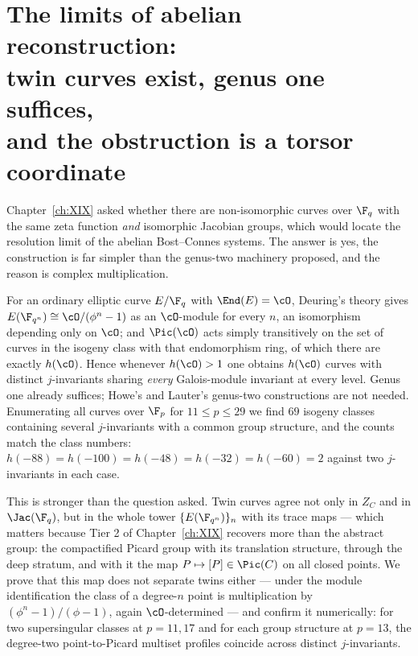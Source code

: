 \chapter[The limits of abelian reconstruction]{The limits of abelian reconstruction:\\ twin curves exist, genus one suffices,\\ and the obstruction is a torsor coordinate}\label{ch:XX}
\begin{summary}
Chapter~\ref{ch:XIX} asked whether there are non-isomorphic curves over $\F_q$ with the
same zeta function \emph{and} isomorphic Jacobian groups, which would locate the resolution
limit of the abelian Bost--Connes systems. The answer is yes, the construction is far simpler
than the genus-two machinery proposed, and the reason is complex multiplication.

For an ordinary elliptic curve $E/\F_q$ with $\End(E)=\cO$, Deuring's theory gives
$E(\F_{q^n})\cong\cO/(\phi^n-1)$ as an $\cO$-module for every $n$, an isomorphism depending
only on $\cO$; and $\Pic(\cO)$ acts simply transitively on the set of curves in the isogeny
class with that endomorphism ring, of which there are exactly $h(\cO)$. Hence whenever
$h(\cO)>1$ one obtains $h(\cO)$ curves with distinct $j$-invariants sharing \emph{every}
Galois-module invariant at every level. Genus one already suffices; Howe's and Lauter's
genus-two constructions are not needed. Enumerating all curves over $\F_p$ for $11\le p\le29$ we
find $69$ isogeny classes containing several $j$-invariants with a common group structure,
and the counts match the class numbers: $h(-88)=h(-100)=h(-48)=h(-32)=h(-60)=2$ against two
$j$-invariants in each case.

This is stronger than the question asked. Twin curves agree not only in $Z_C$ and in
$\Jac(\F_q)$, but in the whole tower $\{E(\F_{q^n})\}_n$ with its trace maps --- which matters
because Tier 2 of Chapter~\ref{ch:XIX} recovers more than the abstract group: the compactified Picard
group with its translation structure, through the deep stratum, and with it the map
$P\mapsto[P]\in\Pic(C)$ on all closed points. We prove that this map does not separate twins
either --- under the module identification the class of a degree-$n$ point is multiplication
by $(\phi^n-1)/(\phi-1)$, again $\cO$-determined --- and confirm it numerically: for two
supersingular classes at $p=11,17$ and for each group structure at $p=13$, the degree-two
point-to-Picard multiset profiles coincide across distinct $j$-invariants.


\end{summary}
